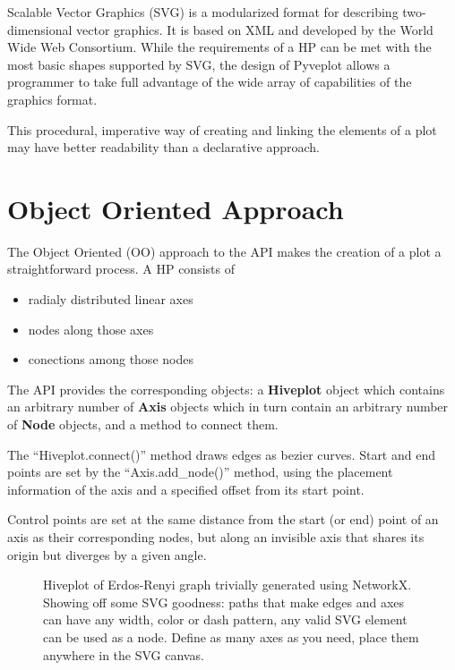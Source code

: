\documentclass{bioinfo}
\begin{document}
Scalable Vector Graphics (SVG) is a modularized format for describing
two-dimensional vector graphics. It is based on XML and developed by
the World Wide Web Consortium. \cite{McCormack:11:SVG} While the
requirements of a HP can be met with the most basic shapes supported
by SVG, the design of Pyveplot allows a programmer to take full
advantage of the wide array of capabilities of the graphics format.

This procedural, imperative way of creating and linking the elements of a plot may
have better readability than a declarative approach.

\section{Object Oriented Approach}

The Object Oriented (OO) approach to the API makes the creation of a
plot a straightforward process. A HP consists of
\begin{itemize}
\item radialy distributed linear axes
\item nodes along those axes
\item conections among those nodes
\end{itemize}
The API provides the corresponding objects: a {\bfseries Hiveplot} object
which contains an arbitrary number of {\bfseries Axis} objects which in
turn contain an arbitrary number of {\bfseries Node} objects, and a method
to connect them.

The ``Hiveplot.connect()'' method draws edges as bezier curves. Start and
end points are set by the ``Axis.add\_node()'' method, using the placement
information of the axis and a specified offset from its start point.

Control points are set at the same distance from the start (or end)
point of an axis as their corresponding nodes, but along an invisible
axis that shares its origin but diverges by a given angle.


\begin{figure}[!tpb]%
  \caption{Hiveplot of Erdos-Renyi graph trivially generated using
    NetworkX. Showing off some SVG goodness: paths that make edges
    and axes can have any width, color or dash pattern, any valid SVG
    element can be used as a node. Define as many axes as you need,
    place them anywhere in the SVG canvas.}\label{fig:01}
\end{figure}
\end{document}
